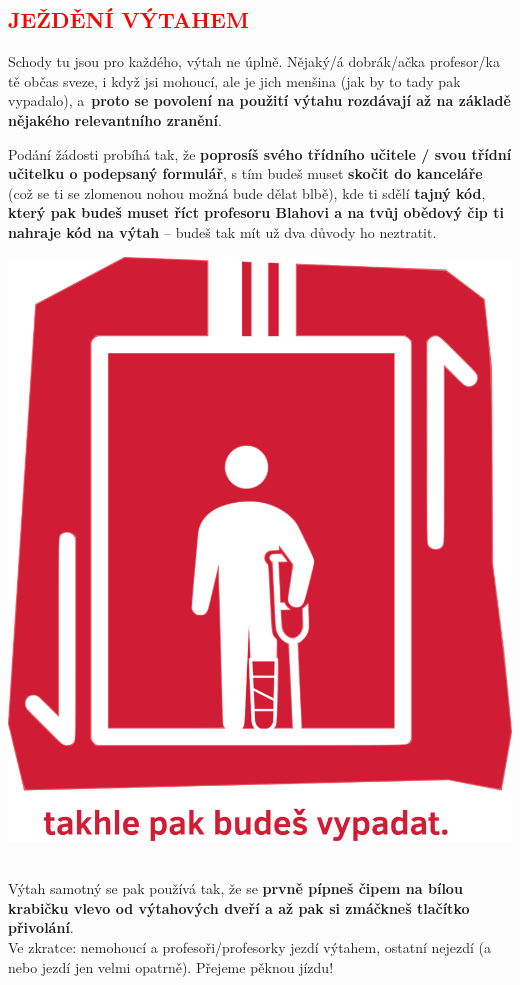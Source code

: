 \documentclass[a5paper, twoside]{article}
\newcommand{\podnadpis}[2]{
  \subsection*{\textcolor{#2}{#1}}
}
\begin{document}
\podnadpis{JEŽDĚNÍ VÝTAHEM}{red}
\begin{minipage}{0.65\linewidth}
	\par Schody tu jsou pro každého, výtah ne úplně. Nějaký/á dobrák/ačka profesor/ka tě občas sveze, i když jsi mohoucí, ale je jich menšina (jak by to tady pak vypadalo), a~\textbf{proto se povolení na použití výtahu rozdávají až na základě nějakého relevantního zranění}.
  \par Podání žádosti probíhá tak, že \textbf{poprosíš svého třídního učitele / svou třídní učitelku o podepsaný formulář}, s tím budeš muset \textbf{skočit do kanceláře} (což se ti se zlomenou nohou možná bude dělat blbě), kde ti sdělí \textbf{tajný kód}, \textbf{který pak budeš muset říct profesoru Blahovi a na tvůj
		obědový čip ti nahraje kód na výtah} -- budeš tak mít už dva důvody ho neztratit.
\end{minipage}
\begin{minipage}{0.35\linewidth}
	\centering
	\includegraphics[width=0.90\linewidth]{vytah.png}
\end{minipage}
\vspace{0pt}\\
\noindent
Výtah samotný se pak používá tak, že se \textbf{prvně pípneš čipem na bílou krabičku
	vlevo od výtahových dveří a až pak si zmáčkneš tlačítko přivolání}. \\
Ve zkratce: nemohoucí a profesoři/profesorky jezdí výtahem, ostatní nejezdí (a nebo jezdí jen
velmi opatrně). Přejeme pěknou jízdu!
\end{document}
